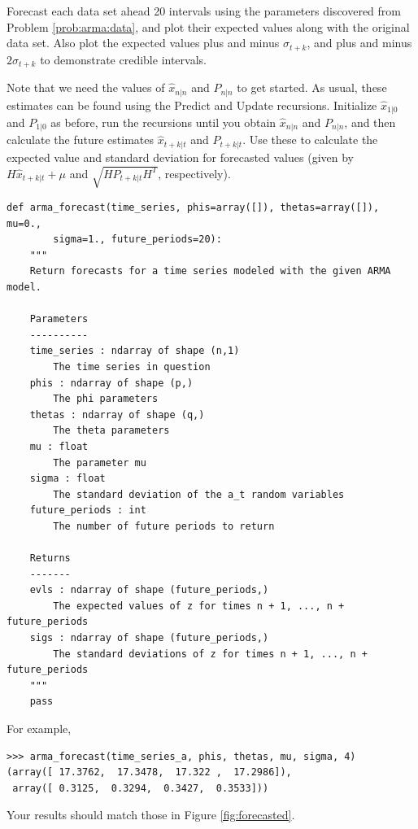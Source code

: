 \begin{problem}
\label{prob:arma:forecast}
Forecast each data set ahead 20 intervals using the parameters discovered from
Problem \ref{prob:arma:data}, and plot their expected values along with the
original data set. Also plot the expected values plus and minus $\sigma_{t+k}$,
and plus and minus $2\sigma_{t+k}$ to demonstrate credible intervals.

Note that we need the values of $\hat{x}_{n|n}$ and $P_{n|n}$ to get started.
As usual, these estimates can be found using the Predict and Update recursions.
Initialize $\hat{x}_{1|0}$ and $P_{1|0}$ as before, run the recursions until you
obtain $\hat{x}_{n|n}$ and $P_{n|n}$, and then calculate the future
estimates $\hat{x}_{t+k|t}$ and $P_{t+k|t}$. Use these to calculate the expected
value and standard deviation for forecasted values (given by $H\hat{x}_{t+k|t} + \mu$
and $\sqrt{HP_{t+k|t}H^T}$, respectively).
\begin{lstlisting}
def arma_forecast(time_series, phis=array([]), thetas=array([]), mu=0.,
        sigma=1., future_periods=20):
    """
    Return forecasts for a time series modeled with the given ARMA model.

    Parameters
    ----------
    time_series : ndarray of shape (n,1)
        The time series in question
    phis : ndarray of shape (p,)
        The phi parameters
    thetas : ndarray of shape (q,)
        The theta parameters
    mu : float
        The parameter mu
    sigma : float
        The standard deviation of the a_t random variables
    future_periods : int
        The number of future periods to return

    Returns
    -------
    evls : ndarray of shape (future_periods,)
        The expected values of z for times n + 1, ..., n + future_periods
    sigs : ndarray of shape (future_periods,)
        The standard deviations of z for times n + 1, ..., n + future_periods
    """
    pass
\end{lstlisting}

\vspace{3mm} \noindent
For example,
\begin{lstlisting}
>>> arma_forecast(time_series_a, phis, thetas, mu, sigma, 4)
(array([ 17.3762,  17.3478,  17.322 ,  17.2986]),
 array([ 0.3125,  0.3294,  0.3427,  0.3533]))
\end{lstlisting}

\vspace{3mm} \noindent
Your results should match those in Figure \ref{fig:forecasted}.
\end{problem}

